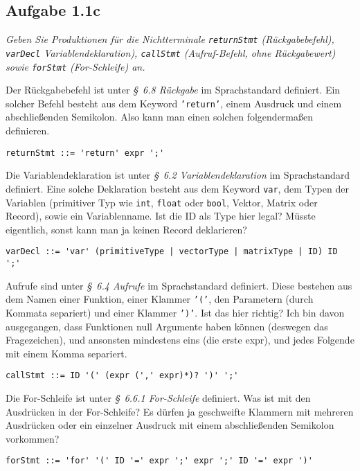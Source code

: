 \documentclass[
  ngerman,
  DIV=14
]{scrartcl}
\begin{document}
\subsection*{Aufgabe 1.1c}

\emph{Geben Sie Produktionen für die Nichtterminale \texttt{returnStmt} (Rückgabebefehl), \texttt{varDecl} Variablendeklaration), \texttt{callStmt} (Aufruf-Befehl, ohne Rückgabewert) sowie \texttt{forStmt} (For-Schleife) an.}

\bigskip\noindent
Der Rückgabebefehl ist unter \emph{§~6.8 Rückgabe} im Sprachstandard definiert. Ein solcher Befehl besteht aus dem Keyword \texttt{'return'}, einem Ausdruck und einem abschließenden Semikolon. Also kann man einen solchen folgendermaßen definieren.
\begin{lstlisting}
returnStmt ::= 'return' expr ';'
\end{lstlisting}
Die Variablendeklaration ist unter \emph{§~6.2 Variablendeklaration} im Sprachstandard definiert. Eine solche Deklaration besteht aus dem Keyword \texttt{var}, dem Typen der Variablen (primitiver Typ wie \texttt{int}, \texttt{float} oder \texttt{bool}, Vektor, Matrix oder Record), sowie ein Variablenname. {\color{red!80!black}Ist die ID als Type hier legal? Müsste eigentlich, sonst kann man ja keinen Record deklarieren?}
\begin{lstlisting}
varDecl ::= 'var' (primitiveType | vectorType | matrixType | ID) ID ';'  
\end{lstlisting}
Aufrufe sind unter \emph{§~6.4 Aufrufe} im Sprachstandard definiert. Diese bestehen aus dem Namen einer Funktion, einer Klammer \texttt{'('}, den Parametern (durch Kommata separiert) und einer Klammer \texttt{')'}. {\color{red!80!black}Ist das hier richtig? Ich bin davon ausgegangen, dass Funktionen null Argumente haben können (deswegen das Fragezeichen), und ansonsten mindestens eins (die erste expr), und jedes Folgende mit einem Komma separiert.}
\begin{lstlisting}
callStmt ::= ID '(' (expr (',' expr)*)? ')' ';'
\end{lstlisting}
Die For-Schleife ist unter \emph{§~6.6.1 For-Schleife} definiert. {\color{red!80!black}Was ist mit den Ausdrücken in der For-Schleife? Es dürfen ja geschweifte Klammern mit mehreren Ausdrücken oder ein einzelner Ausdruck mit einem abschließenden Semikolon vorkommen?}
\begin{lstlisting}
forStmt ::= 'for' '(' ID '=' expr ';' expr ';' ID '=' expr ')'  
\end{lstlisting}
\end{document}
